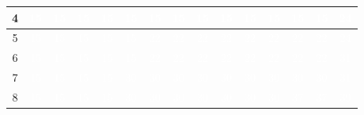 \documentclass{article}
\begin{document}
\begin{center}
\begin{tabular}{|c|c|c|c|c|c|c|c|c|c|c|c|c|c|c|}
4 & \cellcolor{verde}\textcolor{white}{15} & \cellcolor{rojo}\textcolor{white}{15} & \cellcolor{rojo}\textcolor{white}{15} & \cellcolor{rojo}\textcolor{white}{15} & \cellcolor{rojo}\textcolor{white}{15} & \cellcolor{rojo}\textcolor{white}{15} & \cellcolor{rojo}\textcolor{white}{15} & \cellcolor{rojo}\textcolor{white}{15} & \cellcolor{rojo}\textcolor{white}{15} & \cellcolor{rojo}\textcolor{white}{15} & \cellcolor{rojo}\textcolor{white}{15} & \cellcolor{rojo}\textcolor{white}{15} & \cellcolor{rojo}\textcolor{white}{15} & \cellcolor{verde}\textcolor{white}{24} \\ \hline
5 & \cellcolor{verde}\textcolor{white}{15} & \cellcolor{rojo}\textcolor{white}{15} & \cellcolor{rojo}\textcolor{white}{15} & \cellcolor{rojo}\textcolor{white}{15} & \cellcolor{rojo}\textcolor{white}{15} & \cellcolor{verde}\textcolor{white}{22} & \cellcolor{rojo}\textcolor{white}{22} & \cellcolor{rojo}\textcolor{white}{22} & \cellcolor{rojo}\textcolor{white}{22} & \cellcolor{rojo}\textcolor{white}{22} & \cellcolor{rojo}\textcolor{white}{22} & \cellcolor{rojo}\textcolor{white}{22} & \cellcolor{rojo}\textcolor{white}{22} & \cellcolor{verde}\textcolor{white}{24} \\ \hline
6 & \cellcolor{verde}\textcolor{white}{15} & \cellcolor{rojo}\textcolor{white}{15} & \cellcolor{rojo}\textcolor{white}{15} & \cellcolor{rojo}\textcolor{white}{15} & \cellcolor{rojo}\textcolor{white}{15} & \cellcolor{verde}\textcolor{white}{22} & \cellcolor{rojo}\textcolor{white}{22} & \cellcolor{rojo}\textcolor{white}{22} & \cellcolor{rojo}\textcolor{white}{22} & \cellcolor{rojo}\textcolor{white}{22} & \cellcolor{rojo}\textcolor{white}{22} & \cellcolor{rojo}\textcolor{white}{22} & \cellcolor{rojo}\textcolor{white}{22} & \cellcolor{verde}\textcolor{white}{31} \\ \hline
7 & \cellcolor{verde}\textcolor{white}{15} & \cellcolor{rojo}\textcolor{white}{15} & \cellcolor{rojo}\textcolor{white}{15} & \cellcolor{rojo}\textcolor{white}{15} & \cellcolor{verde}\textcolor{white}{30} & \cellcolor{rojo}\textcolor{white}{30} & \cellcolor{rojo}\textcolor{white}{30} & \cellcolor{rojo}\textcolor{white}{30} & \cellcolor{rojo}\textcolor{white}{30} & \cellcolor{rojo}\textcolor{white}{30} & \cellcolor{rojo}\textcolor{white}{30} & \cellcolor{rojo}\textcolor{white}{30} & \cellcolor{rojo}\textcolor{white}{30} & \cellcolor{verde}\textcolor{white}{31} \\ \hline
8 & \cellcolor{verde}\textcolor{white}{15} & \cellcolor{rojo}\textcolor{white}{15} & \cellcolor{rojo}\textcolor{white}{15} & \cellcolor{rojo}\textcolor{white}{15} & \cellcolor{verde}\textcolor{white}{30} & \cellcolor{rojo}\textcolor{white}{30} & \cellcolor{rojo}\textcolor{white}{30} & \cellcolor{rojo}\textcolor{white}{30} & \cellcolor{rojo}\textcolor{white}{30} & \cellcolor{rojo}\textcolor{white}{30} & \cellcolor{rojo}\textcolor{white}{30} & \cellcolor{verde}\textcolor{white}{37} & \cellcolor{rojo}\textcolor{white}{37} & \cellcolor{verde}\textcolor{white}{39} \\ \hline

\end{tabular}
\end{center}
\end{document}
